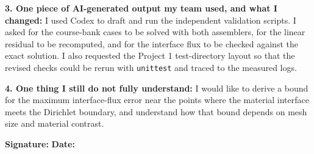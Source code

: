 \documentclass[10pt]{article}
\begin{document}
\begin{formbox}
\textbf{3. One piece of AI-generated output my team used, and what I changed:}
I used Codex to draft and run the independent validation scripts. I asked
for the course-bank cases to be solved with both assemblers, for the linear
residual to be recomputed, and for the interface flux to be checked against
the exact solution. I also requested the Project 1 test-directory layout
so that the revised checks could be rerun with \texttt{unittest} and traced
to the measured logs.

\textbf{4. One thing I still do not fully understand:} I would like to
derive a bound for the maximum interface-flux error near the points where
the material interface meets the Dirichlet boundary, and understand how that
bound depends on mesh size and material contrast.

\vfill
\textbf{Signature:} \underline{\hspace{4.5cm}} \hfill
\textbf{Date:} \underline{\hspace{2.5cm}}
\end{formbox}
\end{document}
